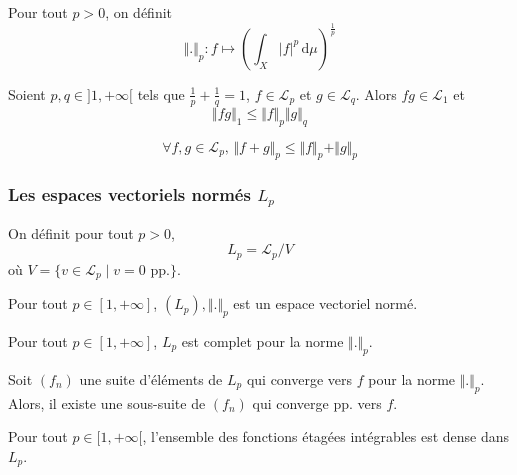  \begin{definition}
    Pour tout $p > 0$, on définit
    \[ \Vert . \Vert_p : f \mapsto \left( \int_X \vert f \vert^p \, \mathrm{d}\mu \right)^{\frac{1}{p}} \]
  \end{definition}

  \begin{theorem}
    Soient $p, q \in ]1, +\infty[$ tels que $\frac{1}{p} + \frac{1}{q} = 1$, $f \in \mathcal{L}_p$ et $g \in \mathcal{L}_q$. Alors $fg \in \mathcal{L}_1$ et
    \[ \Vert fg \Vert_1 \leq \Vert f \Vert_p \Vert g \Vert_q \]
  \end{theorem}

  \begin{theorem}
    \[ \forall f, g \in \mathcal{L}_p, \, \Vert f + g \Vert_p \leq \Vert f \Vert_p + \Vert g \Vert_p \]
  \end{theorem}

  \subsubsection{Les espaces vectoriels normés \texorpdfstring{$L_p$}{Lₚ}}


  \begin{definition}
    On définit pour tout $p > 0$,
    \[ L_p = \mathcal{L}_p / V \]
    où $V = \{ v \in \mathcal{L}_p \mid v = 0 \text{ pp.} \}$.
  \end{definition}

  \begin{theorem}
    Pour tout $p \in [1, +\infty]$, $(L_p), \Vert . \Vert_p$ est un espace vectoriel normé.
  \end{theorem}

  \begin{theorem}
    Pour tout $p \in [1, +\infty]$, $L_p$ est complet pour la norme $\Vert . \Vert_p$.
  \end{theorem}

  \begin{theorem}
    Soit $(f_n)$ une suite d'éléments de $L_p$ qui converge vers $f$ pour la norme $\Vert . \Vert_p$. Alors, il existe une sous-suite de $(f_n)$ qui converge pp. vers $f$.
  \end{theorem}


  \begin{proposition}
    Pour tout $p \in [1, +\infty[$, l'ensemble des fonctions étagées intégrables est dense dans $L_p$.
  \end{proposition}

